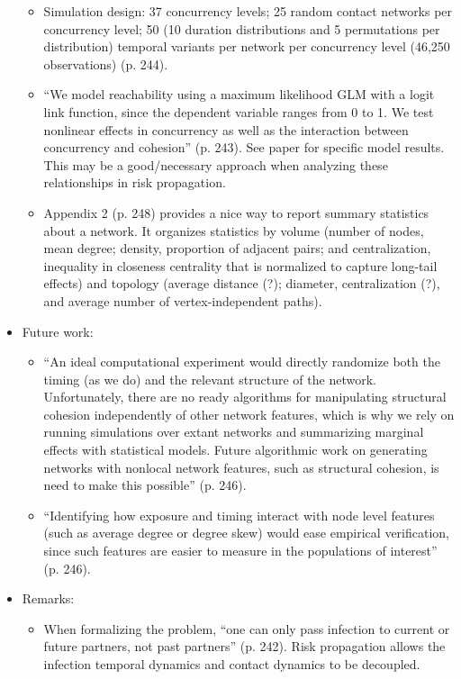 \begin{itemize}
\begin{itemize}
        \item Simulation design: 37 concurrency levels; 25 random contact networks per concurrency level; 50 (10 duration distributions and 5 permutations per distribution) temporal variants per network per concurrency level (46,250 observations) (p. 244).
        \item ``We model reachability using a maximum likelihood GLM with a logit link function, since the dependent variable ranges from 0 to 1. We test nonlinear effects in concurrency as well as the interaction between concurrency and cohesion'' (p. 243). See paper for specific model results. This may be a good/necessary approach when analyzing these relationships in risk propagation.
        \item Appendix 2 (p. 248) provides a nice way to report summary statistics about a network. It organizes statistics by volume (number of nodes, mean degree; density, proportion of adjacent pairs; and centralization, inequality in closeness centrality that is normalized to capture long-tail effects) and topology (average distance (?); diameter, centralization (?), and average number of vertex-independent paths).
    \end{itemize}
\item Future work:
    \begin{itemize}
        \item ``An ideal computational experiment would directly randomize both the timing (as we do) and the relevant structure of the network. Unfortunately, there are no ready algorithms for manipulating structural cohesion independently of other network features, which is why we rely on running simulations over extant networks and summarizing marginal effects with statistical models. Future algorithmic work on generating networks with nonlocal network features, such as structural cohesion, is need to make this possible'' (p. 246).
        \item ``Identifying how exposure and timing interact with node level features (such as average degree or degree skew) would ease empirical verification, since such features are easier to measure in the populations of interest'' (p. 246).
    \end{itemize}
\item Remarks:
    \begin{itemize}
        \item When formalizing the problem, ``one can only pass infection to current or future partners, not past partners'' (p. 242). Risk propagation allows the infection temporal dynamics and contact dynamics to be decoupled.

\end{itemize}
\end{itemize}
